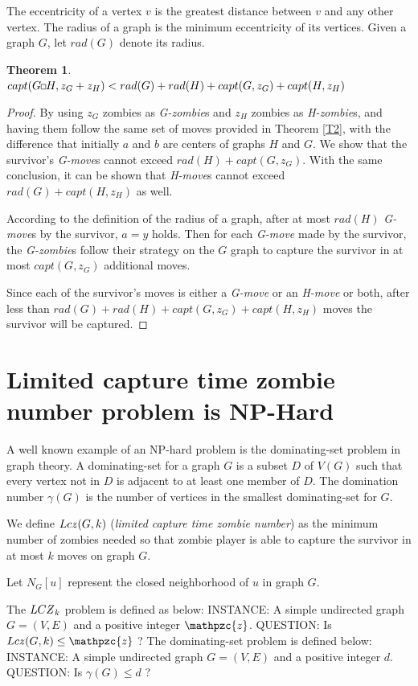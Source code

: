 \documentclass[1p]{elsarticle}
\newtheorem{theorem}{Theorem}
\newcommand{\NPZ}{\ooalign{$Z$\cr\hfil\rule[.8ex]{.3em}{.09ex}\hfil\cr}}
\newcommand{\zn}{\ooalign{$z$\cr\hfil\rule[.5ex]{.2em}{.08ex}\hfil\cr}}
\newcommand{\sq}[1][black]{%
\begin{tikzpicture}                                                           
  \draw[#1] (2pt,0pt) -- (6pt,0pt);   
  \draw[#1] (2pt,0pt) -- (2pt,4pt);    
  \draw[#1] (2pt,4pt) -- (6pt,4pt);   
  \draw[#1] (6pt,0pt) -- (6pt,4pt);
\end{tikzpicture}%
}
\begin{document}
	The eccentricity of a vertex $v$ is the greatest distance between $v$ and any other vertex. The radius of a graph is the
	minimum eccentricity of its vertices. Given a graph $G$, let $rad(G)$ denote its radius.
	\begin{theorem}
		\label{T5}
		$capt( G \sq H, z_G + z_H ) < rad(G) + rad(H) + capt(G, z_G) + capt(H, z_H)$
	\end{theorem}
	\begin{proof}
		By using $z_G$ zombies as {\it G-zombie}s and $z_H$ zombies as {\it H-zombie}s, and having them follow the same
		set of moves provided in Theorem \ref{T2}, with the difference that initially $a$ and $b$ are centers of graphs
		$H$ and $G$. We show that the survivor's {\it G-move}s cannot exceed $rad(H) + capt(G, z_G)$. With the same
		conclusion, it can be shown that {\it H-move}s cannot exceed $rad(G) + capt(H, z_H)$ as well.

		According to the definition of the radius of a graph, after at most $rad(H)$ {\it G-move}s by the survivor, $a =
		y$ holds. Then for each {\it G-move} made by the survivor, the {\it G-zombie}s follow their strategy on the $G$
		graph to capture the survivor in at most $capt(G,z_G)$ additional moves.
		
		Since each of the survivor's moves is either a {\it G-move} or an {\it H-move} or both, after less than $rad(G)
		+ rad(H) + capt(G, z_G) + capt(H, z_H)$ moves the survivor will be captured.
	\end{proof}
\section{Limited capture time zombie number problem is NP-Hard}\label{np-capturetime} 

	A well known example of an NP-hard problem is the dominating-set problem in graph theory\cite{Hopcroft07}. A
	dominating-set for a graph $G$ is a subset $D$ of $V(G)$ such that every vertex not in $D$ is adjacent to at least
	one member of $D$. The domination number $\gamma(G)$ is the number of vertices in the smallest dominating-set for
	$G$.

	We define $Lc\zn(G,k)$ ({\it limited capture time zombie number}) as the minimum number of zombies needed so that
	zombie player is able to capture the survivor in at most $k$ moves on graph $G$. 

	Let $N_G[u]$ represent the closed neighborhood of $u$ in graph $G$.
	
	The $LC\NPZ_k$ problem is defined as below:
	{\newline}
	INSTANCE: A simple undirected graph $G = (V,E)$ and a positive integer $\mathpzc{z}$.
	{\newline}
	QUESTION: Is $Lc\zn(G,k) \leq \mathpzc{z}$ ?
	{\newline}
	{\newline}
	The dominating-set problem is defined below:
	{\newline}
	INSTANCE: A simple undirected graph $G = (V,E)$ and a positive integer $d$.
	{\newline}
	QUESTION: Is $\gamma(G) \leq d$ ?
\end{document}
